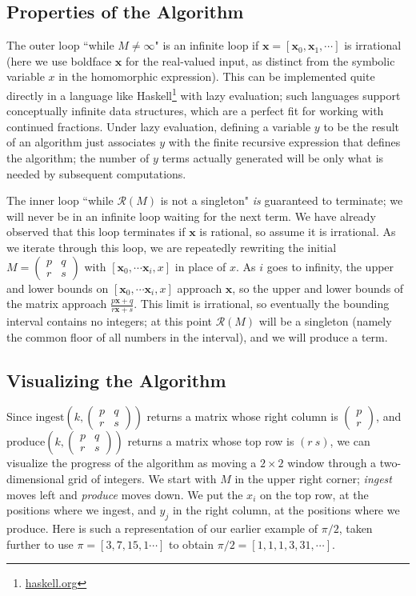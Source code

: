 \documentclass[11pt, oneside]{amsart}   	%
\newcommand{\pqrs}{\left(
\begin{smallmatrix} 
p & q\\ 
r & s 
\end{smallmatrix}
\right)}
\begin{document}
\subsection{Properties of the Algorithm}
The outer loop ``while $M \neq \infty$" is an infinite loop if $\mathbf{x} = [\mathbf{x}_0, \mathbf{x}_1,\cdots]$ is irrational
(here we use boldface $\mathbf{x}$ for the real-valued input, as distinct from the symbolic variable $x$ in the homomorphic
expression). This can be implemented quite directly in a language like Haskell\footnote{\href{https://haskell.org}{haskell.org}} with
lazy evaluation; such languages support conceptually infinite data structures, which are a perfect fit for working with continued
fractions. Under lazy evaluation, defining a variable $y$ to be the result of an algorithm just associates $y$ with the finite recursive
expression that defines the algorithm; the number of $y$ terms actually generated will be only what is needed by subsequent computations.

The inner loop ``while $\mathcal{R}(M)$ is not a singleton" \emph{is} guaranteed to terminate; we will never be in an infinite loop
waiting for the next term. We have already observed that this loop terminates if $\mathbf{x}$ is rational, so assume it is irrational. As
we iterate through this loop, we are repeatedly rewriting the initial $M = \pqrs$
with $[\mathbf{x}_0, \cdots \mathbf{x}_i, x]$ in place of $x$. As $i$ goes to infinity, the upper and lower bounds on
$[\mathbf{x}_0, \cdots \mathbf{x}_i, x]$ approach $\mathbf{x}$, so the upper and lower bounds of the matrix approach
$\frac{p\mathbf{x}+q}{r\mathbf{x}+s}$.
This limit is irrational, so eventually the bounding interval contains no integers; at this point $\mathcal{R}(M)$  will be a singleton
(namely the common floor of all numbers in the interval), and we will produce a term.


\subsection{Visualizing the Algorithm}
Since $\mbox{ingest}(k,\pqrs)$ returns a matrix whose right column is
$\left( \begin{smallmatrix} p \\  r \end{smallmatrix}\right)$,
and $\mbox{produce}(k,\pqrs)$ returns a matrix whose top row is $(r\ s)$, we can visualize the progress of the algorithm
as moving a $2 \times 2$ window through a two-dimensional grid of integers.
We start with $M$ in the upper right corner; \emph{ingest} moves left and \emph{produce} moves down.
We put the $x_i$ on the top row, at the positions where we ingest, and $y_j$ in the right column, at the positions where we produce.
Here is such a representation of our earlier example of $\pi/2$, taken further to use $\pi = [3,7,15, 1\cdots]$ to obtain $\pi/2 = [1,1,1,3,31,\cdots]$.
\end{document}
